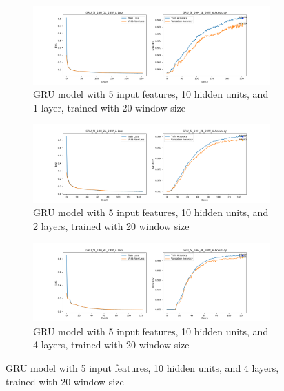 \documentclass{article}
\begin{document}
    \begin{figure}[ht]
        \centering
        \begin{subfigure}
            {\textwidth}
            \centering
            \includegraphics[width=\textwidth]{GRU_5I_10H_1L_20W_A_GRAPH.png}
            \caption{GRU model with 5 input features, 10 hidden units, and 1
            layer, trained with 20 window size}
            \label{fig:GRU_5I_10H_1L_20W_A_GRAPH}
        \end{subfigure}
        \begin{subfigure}
            {\textwidth}
            \centering
            \includegraphics[width=\textwidth]{GRU_5I_10H_2L_20W_A_GRAPH.png}
            \caption{GRU model with 5 input features, 10 hidden units, and 2
            layers, trained with 20 window size}
            \label{fig:GRU_5I_10H_2L_20W_A_GRAPH}
        \end{subfigure}
        \begin{subfigure}
            {\textwidth}
            \centering
            \includegraphics[width=\textwidth]{GRU_5I_10H_4L_20W_A_GRAPH.png}
            \caption{GRU model with 5 input features, 10 hidden units, and 4
            layers, trained with 20 window size}

\end{subfigure}
\end{figure}
\end{document}
